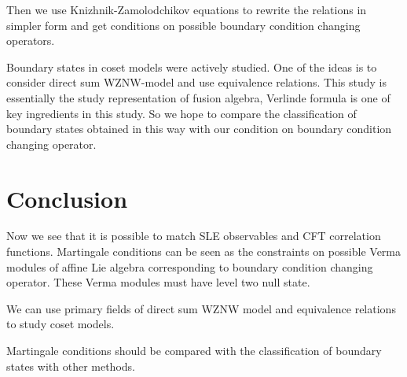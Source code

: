 Then we use Knizhnik-Zamolodchikov equations to rewrite the relations in simpler form and get conditions on possible boundary condition changing operators. 

Boundary states in coset models were actively studied. One of the ideas is to consider direct sum WZNW-model and use equivalence relations. This study is essentially the study representation of fusion algebra, Verlinde formula is one of key ingredients in this study. So we hope to compare the classification of boundary states obtained in this way with our condition on boundary condition changing operator. 

\section{Conclusion}
\label{sec:conclusion}

Now we see that it is possible to match SLE observables and CFT correlation functions. Martingale conditions can be seen as the constraints on possible Verma modules of affine Lie algebra corresponding to boundary condition changing operator. These Verma modules must have level two null state. 

We can use primary fields of direct sum WZNW model and equivalence relations to study coset models. 

Martingale conditions should be compared with the classification of boundary states with other methods.



